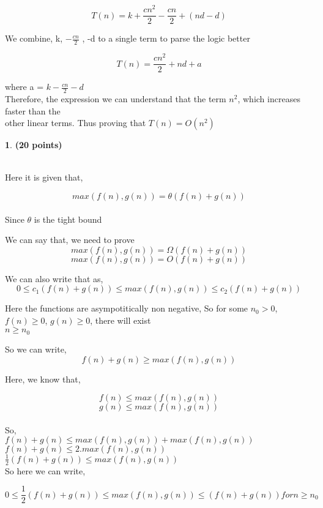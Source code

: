 \documentclass[11pt]{article}
\theoremstyle{definition}
\newtheorem{prob}{}
\newcommand{\solution}{\medskip\noindent{\color{DarkBlue}\textbf{Solution:}}}
\begin{document}
\[ T(n) = k + \frac{cn^2}{2} - \frac{cn}{2} + (nd-d) \]

We combine, k, $-\frac{cn}{2}$ , -d to a single term to parse the logic better

\[ T(n) = \frac{cn^2}{2} + nd + a \]

where a = $k - \frac{cn}{2} -d$ \\

Therefore, the expression we can understand that the term $n^2$, which increases faster than the \\
other linear terms. Thus proving that $T(n) = O(n^2)$

\begin{prob} \textbf{(20 points)}
\end{prob}
\solution \\

Here it is given that, 

\[ max(f(n),g(n)) = \theta(f(n)+g(n)) \]
\\
\tabto{0.6cm}Since $\theta$ is the tight bound

We can say that, we need to prove 
\[ max(f(n),g(n)) = \Omega(f(n)+g(n)) \]
\[ max(f(n),g(n)) = O(f(n)+g(n)) \]

We can also write that as, 
\[ 0 \leq c_1(f(n)+g(n)) \leq max(f(n),g(n)) \leq c_2(f(n)+g(n))\]

Here the functions are asympotitically non negative, So for some $n_0 > 0$, $f(n) \geq 0$, $g(n) \geq 0$, there will exist \\

$n \geq n_0$

So we can write, \\
\[ f(n) + g(n) \geq max(f(n),g(n)) \]

Here, we know that,

\[ f(n) \leq max(f(n),g(n)) \]
\[ g(n) \leq max(f(n),g(n)) \]
\\

So, \\

$f(n) + g(n) \leq max(f(n),g(n)) + max(f(n),g(n))$ \\

$f(n) + g(n) \leq 2.max(f(n),g(n))$ \\

$\frac{1}{2}(f(n) + g(n)) \leq max(f(n),g(n))$ \\

So here we can write, 

\[ 0 \leq \frac{1}{2}(f(n)+g(n)) \leq max(f(n),g(n)) \leq (f(n)+g(n)) for n \geq n_0\]
\end{document}
